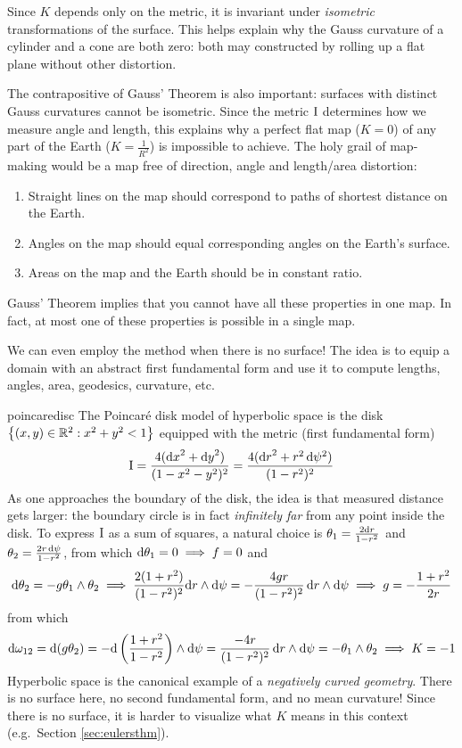 Since $K$ depends only on the metric, it is invariant under \emph{isometric} transformations of the surface. This helps explain why the Gauss curvature of a cylinder and a cone are both zero: both may constructed by rolling up a flat plane without other distortion.\smallbreak

The contrapositive of Gauss' Theorem is also important: surfaces with distinct Gauss curvatures cannot be isometric. Since the metric $\mathrm{I}$ determines how we measure angle and length, this explains why a perfect flat map ($K=0$) of any part of the Earth ($K=\frac 1{R^2}$) is impossible to achieve. The holy grail of map-making would be a map free of direction, angle and length/area distortion:
\begin{enumerate}
  \item Straight lines on the map should correspond to paths of shortest distance on the Earth.
  \item Angles on the map should equal corresponding angles on the Earth's surface.
  \item Areas on the map and the Earth should be in constant ratio.
\end{enumerate}
Gauss' Theorem implies that you cannot have all these properties in one map. In fact, at most one of these properties is possible in a single map.


\goodbreak



We can even employ the method when there is no surface! The idea is to equip a domain with an abstract first fundamental form and use it to compute lengths, angles, area, geodesics, curvature, etc.

\begin{example}{}{poincaredisc}
	The Poincaré disk model of hyperbolic space is the disk $\bigl\{(x,y)\in\mathbb{R}^2:x^2+y^2<1\bigr\}$ equipped with the metric (first fundamental form)
	\[
		\mathrm{I}=\frac{4({\mathrm{d} x}^2+{\mathrm{d} y}^2)}{(1-x^2-y^2)^2}=\frac{4({\mathrm{d} r}^2+r^2\,\mathrm{d}\psi^2)}{(1-r^2)^2}
	\]
	As one approaches the boundary of the disk, the idea is that measured distance gets larger: the boundary circle is in fact \emph{infinitely far} from any point inside the disk. To express $\mathrm{I}$ as a sum of squares, a natural choice is $\theta_1=\frac{2{\mathrm{d} r}}{1-r^2}$ and $\theta_2=\frac{2r\,\mathrm{d}\psi}{1-r^2}$, from which $\mathrm{d}\theta_1=0\implies f=0$ and
  \begin{gather*}
		\mathrm{d}\theta_2=-g\theta_1\wedge\theta_2\implies \frac{2(1+r^2)}{(1-r^2)^2}{\mathrm{d} r}\wedge\mathrm{d}\psi=-\frac{4gr}{(1-r^2)^2}\,{\mathrm{d} r}\wedge\mathrm{d}\psi\implies g=-\frac{1+r^2}{2r}
  \end{gather*}
	from which
  \[\mathrm{d}\omega_{12}=\mathrm{d}(g\theta_2)=-\mathrm{d}\left(\frac{1+r^2}{1-r^2}\right)\wedge\mathrm{d}\psi =\frac{-4r}{(1-r^2)^2}\,{\mathrm{d} r}\wedge\mathrm{d}\psi =-\theta_1\wedge\theta_2\implies K=-1\]
  Hyperbolic space is the canonical example of a \emph{negatively curved geometry}. There is no surface here, no second fundamental form, and no mean curvature! Since there is no surface, it is harder to visualize what $K$ means in this context (e.g.\ Section \ref{sec:eulersthm}).\footnotemark{}
\end{example}

